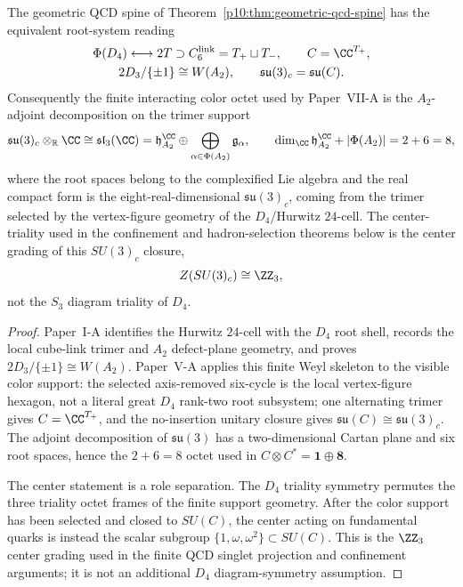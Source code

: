 \documentclass[12pt,a4paper]{article}
\begin{document}
\begin{proposition}
\label{p10:prop:d4-a2-reading-of-qcd-color-support}
The geometric QCD spine of Theorem~\ref{p10:thm:geometric-qcd-spine} has the equivalent root-system reading
\[
\begin{gathered}
\Phi(D_4)\longleftrightarrow 2T
\supset C_6^{\rm link}=T_+\sqcup T_-,
\qquad C=\CC^{T_+},\\
2D_3/\{\pm1\}\cong W(A_2),
\qquad
\mathfrak{su}(3)_c=\mathfrak{su}(C).
\end{gathered}
\]
Consequently the finite interacting color octet used by Paper~VII-A is the \(A_2\)-adjoint decomposition on the trimer support
\[
\mathfrak{su}(3)_c\otimes_{\mathbb R}\CC
\cong\mathfrak{sl}_3(\CC)
=\mathfrak h_{A_2}^{\CC}
\oplus
\bigoplus_{\alpha\in\Phi(A_2)}\mathfrak g_\alpha,
\qquad
\dim_{\CC}\mathfrak h_{A_2}^{\CC}+|\Phi(A_2)|=2+6=8,
\]
where the root spaces belong to the complexified Lie algebra and the real compact form is the eight-real-dimensional $\mathfrak{su}(3)_c$, coming from the trimer selected by the vertex-figure geometry of the \(D_4\)/Hurwitz \(24\)-cell.  The center-triality used in the confinement and hadron-selection theorems below is the center grading of this \(SU(3)_c\) closure,
\[
Z(SU(3)_c)\cong\ZZ_3,
\]
not the \(S_3\) diagram triality of \(D_4\).
\end{proposition}

\begin{proof}
Paper~I-A identifies the Hurwitz \(24\)-cell with the \(D_4\) root shell, records the local cube-link trimer and \(A_2\) defect-plane geometry, and proves \(2D_3/\{\pm1\}\cong W(A_2)\).  Paper~V-A applies this finite Weyl skeleton to the visible color support: the selected axis-removed six-cycle is the local vertex-figure hexagon, not a literal great \(D_4\) rank-two root subsystem; one alternating trimer gives \(C=\CC^{T_+}\), and the no-insertion unitary closure gives \(\mathfrak{su}(C)\cong\mathfrak{su}(3)_c\).  The adjoint decomposition of \(\mathfrak{su}(3)\) has a two-dimensional Cartan plane and six root spaces, hence the \(2+6=8\) octet used in \(C\otimes C^\ast=\mathbf1\oplus\mathbf8\).

The center statement is a role separation.  The \(D_4\) triality symmetry permutes the three triality octet frames of the finite support geometry.  After the color support has been selected and closed to \(SU(C)\), the center acting on fundamental quarks is instead the scalar subgroup \(\{1,\omega,\omega^2\}\subset SU(C)\).  This is the \(\ZZ_3\) center grading used in the finite QCD singlet projection and confinement arguments; it is not an additional \(D_4\) diagram-symmetry assumption.
\end{proof}
\end{document}
